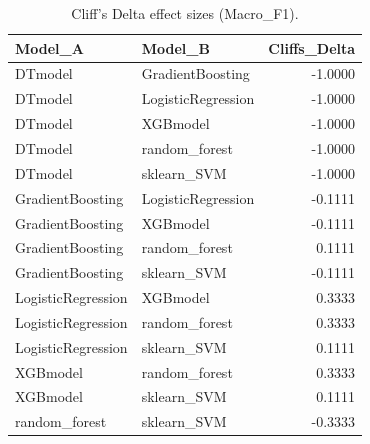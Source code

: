 \begin{table}[t]
\centering
\begin{tabular}{llr}
\toprule
Model_A & Model_B & Cliffs_Delta \\
\midrule
DTmodel & GradientBoosting & -1.0000 \\
DTmodel & LogisticRegression & -1.0000 \\
DTmodel & XGBmodel & -1.0000 \\
DTmodel & random_forest & -1.0000 \\
DTmodel & sklearn_SVM & -1.0000 \\
GradientBoosting & LogisticRegression & -0.1111 \\
GradientBoosting & XGBmodel & -0.1111 \\
GradientBoosting & random_forest & 0.1111 \\
GradientBoosting & sklearn_SVM & -0.1111 \\
LogisticRegression & XGBmodel & 0.3333 \\
LogisticRegression & random_forest & 0.3333 \\
LogisticRegression & sklearn_SVM & 0.1111 \\
XGBmodel & random_forest & 0.3333 \\
XGBmodel & sklearn_SVM & 0.1111 \\
random_forest & sklearn_SVM & -0.3333 \\
\bottomrule
\end{tabular}
\caption{Cliff's Delta effect sizes (Macro_F1).}
\label{tab:cliffs_Macro_F1}
\end{table}